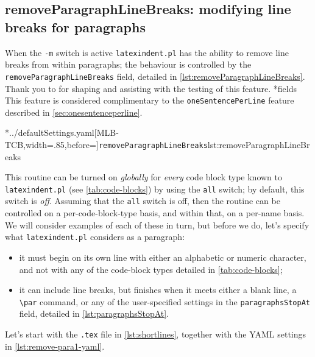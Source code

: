 \subsection{removeParagraphLineBreaks: modifying line breaks for paragraphs}\label{subsec:removeparagraphlinebreaks} When the \texttt{-m} switch is active
	\texttt{latexindent.pl} has the ability to remove line
	breaks%
	from within paragraphs; the behaviour is controlled by the
	\texttt{removeParagraphLineBreaks} field, detailed in
	\cref{lst:removeParagraphLineBreaks}. Thank you to \cite{jowens} for shaping and
	assisting with the testing of this feature.
*{fields}
	This feature is considered complimentary to the \texttt{oneSentencePerLine} feature
	described in \vref{sec:onesentenceperline}.

	\cmhlistingsfromfile[style=removeParagraphLineBreaks]*{../defaultSettings.yaml}[MLB-TCB,width=.85\linewidth,before=\centering]{\texttt{removeParagraphLineBreaks}}{lst:removeParagraphLineBreaks}

	This routine can be turned on \emph{globally} for \emph{every} code block type known to
	\texttt{latexindent.pl} (see \vref{tab:code-blocks}) by using the \texttt{all} switch; by
	default, this switch is \emph{off}. Assuming that the \texttt{all} switch is off, then
	the routine can be controlled on a per-code-block-type basis, and within that, on a
	per-name basis. We will consider examples of each of these in turn, but before we do,
	let's specify what \texttt{latexindent.pl} considers as a paragraph:
	\begin{itemize}
		\item it must begin on its own line with either an alphabetic or numeric character, and not
		      with any of the code-block types detailed in \vref{tab:code-blocks};
		\item it can include line breaks, but finishes when it meets either a blank line, a
		      \lstinline!\par! command, or any of the user-specified settings in the
		      \texttt{paragraphsStopAt} field, detailed in \vref{lst:paragraphsStopAt}.
	\end{itemize}

	Let's start with the \texttt{.tex} file in \cref{lst:shortlines}, together with the YAML
	settings in \cref{lst:remove-para1-yaml}.

